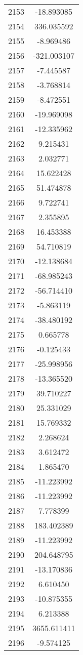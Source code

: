 \documentclass[12pt]{article}
\begin{document}
\begin{longtable}{@{}cc@{}}
2153 & -18.893085 \\
2154 & 336.035592 \\
2155 & -8.969486 \\
2156 & -321.003107 \\
2157 & -7.445587 \\
2158 & -3.768814 \\
2159 & -8.472551 \\
2160 & -19.969098 \\
2161 & -12.335962 \\
2162 & 9.215431 \\
2163 & 2.032771 \\
2164 & 15.622428 \\
2165 & 51.474878 \\
2166 & 9.722741 \\
2167 & 2.355895 \\
2168 & 16.453388 \\
2169 & 54.710819 \\
2170 & -12.138684 \\
2171 & -68.985243 \\
2172 & -56.714410 \\
2173 & -5.863119 \\
2174 & -38.480192 \\
2175 & 0.665778 \\
2176 & -0.125433 \\
2177 & -25.998956 \\
2178 & -13.365520 \\
2179 & 39.710227 \\
2180 & 25.331029 \\
2181 & 15.769332 \\
2182 & 2.268624 \\
2183 & 3.612472 \\
2184 & 1.865470 \\
2185 & -11.223992 \\
2186 & -11.223992 \\
2187 & 7.778399 \\
2188 & 183.402389 \\
2189 & -11.223992 \\
2190 & 204.648795 \\
2191 & -13.170836 \\
2192 & 6.610450 \\
2193 & -10.875355 \\
2194 & 6.213388 \\
2195 & 3655.611411 \\
2196 & -9.574125 \\

\end{longtable}
\end{document}
